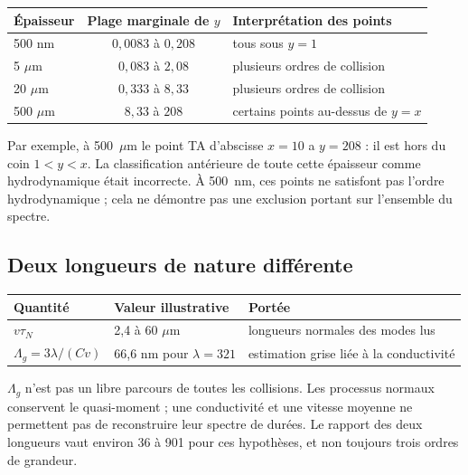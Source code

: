 \documentclass[11pt,a4paper]{article}
\begin{document}
\begin{center}
\begin{tabular}{@{}lcl@{}}
\toprule
Épaisseur & Plage marginale de $y$ & Interprétation des points \\
\midrule
500 nm & $0{,}0083$ à $0{,}208$ & tous sous $y=1$ \\
5 $\mu$m & $0{,}083$ à $2{,}08$ & plusieurs ordres de collision \\
20 $\mu$m & $0{,}333$ à $8{,}33$ & plusieurs ordres de collision \\
500 $\mu$m & $8{,}33$ à $208$ & certains points au-dessus de $y=x$ \\
\bottomrule
\end{tabular}
\end{center}
Par exemple, à 500~$\mu$m le point TA d'abscisse $x=10$ a $y=208$ :
il est hors du coin $1<y<x$. La classification antérieure de toute cette
épaisseur comme hydrodynamique était incorrecte.
À 500~nm, ces points ne satisfont pas l'ordre hydrodynamique ; cela ne
démontre pas une exclusion portant sur l'ensemble du spectre.

\subsection{Deux longueurs de nature différente}
\begin{center}
\begin{tabularx}{\textwidth}{@{}llX@{}}
\toprule
Quantité & Valeur illustrative & Portée \\
\midrule
$v\tau_N$ & 2,4 à 60 $\mu$m & longueurs normales des modes lus \\
$\Lambda_g=3\lambda/(Cv)$ & 66,6 nm pour $\lambda=321$ & estimation grise liée à la conductivité \\
\bottomrule
\end{tabularx}
\end{center}
$\Lambda_g$ n'est pas un libre parcours de toutes les collisions.
Les processus normaux conservent le quasi-moment ; une conductivité et une
vitesse moyenne ne permettent pas de reconstruire leur spectre de durées.
Le rapport des deux longueurs vaut environ 36 à 901 pour ces hypothèses,
et non toujours trois ordres de grandeur.
\end{document}
